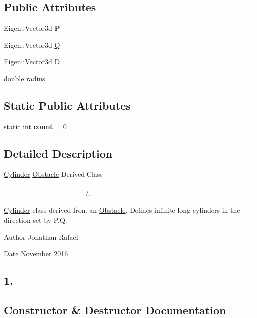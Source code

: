 \subsection*{Public Attributes}
\begin{DoxyCompactItemize}
\item 
\mbox{\label{class_cylinder_ae9823df86b6b76bc86172d84d798494f}} 
Eigen\+::\+Vector3d {\bfseries P}
\item 
Eigen\+::\+Vector3d \hyperlink{class_cylinder_a9f367beb008c847b97bb0ce043601769}{Q}
\item 
Eigen\+::\+Vector3d \hyperlink{class_cylinder_a2e7f0d4e406cc50daf30f3e3b0be1609}{D}
\item 
double \hyperlink{class_cylinder_a8a825799285bcf60b49b8aef0459b498}{radius}
\end{DoxyCompactItemize}
\subsection*{Static Public Attributes}
\begin{DoxyCompactItemize}
\item 
\mbox{\label{class_cylinder_af276a253b655ded13f5dfd5afbff81d1}} 
static int {\bfseries count} = 0
\end{DoxyCompactItemize}


\subsection{Detailed Description}
\hyperlink{class_cylinder}{Cylinder} \hyperlink{class_obstacle}{Obstacle} Derived Class =============================================================/. 

\hyperlink{class_cylinder}{Cylinder} class derived from an \hyperlink{class_obstacle}{Obstacle}. Defines infinite long cylinders in the direction set by P,Q. \begin{DoxyAuthor}{Author}
Jonathan Rafael 
\end{DoxyAuthor}
\begin{DoxyDate}{Date}
November 2016 \subsection*{1. }
\end{DoxyDate}


\subsection{Constructor \& Destructor Documentation}
\mbox{\label{class_cylinder_a0a5f7aa0a0c5c5e17c783784fd99fa1a}} 
